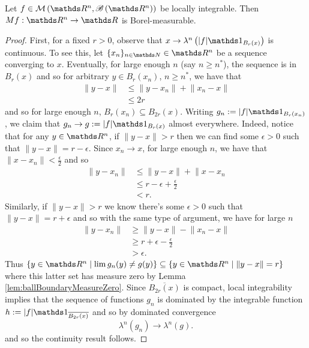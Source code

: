 \begin{prop}
    \label{prop:maximalFunctionMeasurable} Let $f \in \mathcal{M}\left(\R^n, \borel \left( \R^n \right) \right) $ be locally integrable. Then
    $Mf:\R^n \to \R $ is Borel-measurable.
\end{prop}
\begin{proof}
    First, for a fixed $r>0$, observe that $x \to \lambda^n \left(\lvert f \rvert \indicate_{B_r(x)} \right)$ is continuous. To see this, let $\{x_n\}_{n \in \N} \in \R^n$ be a sequence
    converging to $x$.  Eventually, for large enough $n$ (say $n\geq n^*$), the sequence is in $B_r(x)$ and so for arbitrary $y \in B_r(x_n)$, $n \geq n^*$, we have that
    \begin{align*}
        \lVert y - x \rVert &\leq \lVert y - x_{n} \rVert + \lVert x_{n} - x \rVert  \\
        & \leq 2r 
    \end{align*}
    and so for large enough $n$, $B_r(x_n) \subseteq  B_{2r}(x)$. Writing $g_n := \lvert f \rvert \indicate_{B_r(x_n)}$, we claim that $g_n \to g:= \lvert f \rvert \indicate_{B_r(x)}$ almost everywhere. Indeed, notice that for any $y \in \R^n$, if $\lVert y - x\rVert > r$ then we can find some $\epsilon > 0$ such that $\lVert y - x \rVert = r - \epsilon$. Since $x_n \to x$, for large enough $n$, we have that $\lVert x - x_n \rVert < \frac{\epsilon}{2}$ and so 
    \begin{align*}
    	\lVert y - x_n \rVert &\leq \lVert y -x \rVert + \lVert x - x_n \\
    	&\leq r - \epsilon + \frac{\epsilon}{2}\\
    	&< r.
    \end{align*}
    Similarly, if $\lVert y - x \rVert > r$ we know there's some $\epsilon > 0$ such that $\lVert y - x \rVert = r + \epsilon$ and so with the same type of argument, we have for large $n$
    \begin{align*}
    	\lVert y - x_n \rVert &\geq \lVert y - x\rVert - \lVert x_n - x \rVert \\
    	&\geq r + \epsilon - \frac{\epsilon}{2} \\
    	&> \epsilon.
    \end{align*}
    Thus $\{ y \in \R^n \mid \lim g_n(y) \neq g(y)\} \subseteq \{y \in \R^n \mid \lVert y - x \rVert = r\}$ where this latter set has measure zero by Lemma \ref{lem:ballBoundaryMeasureZero}. Since $\overline{B_{2r}(x)}$ is compact, local integrability implies that the sequence of functions $g_n$ is dominated by the integrable function $h := \lvert f \rvert \indicate_{\overline{B_{2r}(x)}}$ and so by dominated convergence 
    \[
    	\lambda^n \left(g_n\right) \to \lambda^n \left(g\right).
    \]
    and so the continuity result follows.
    

\end{proof}
